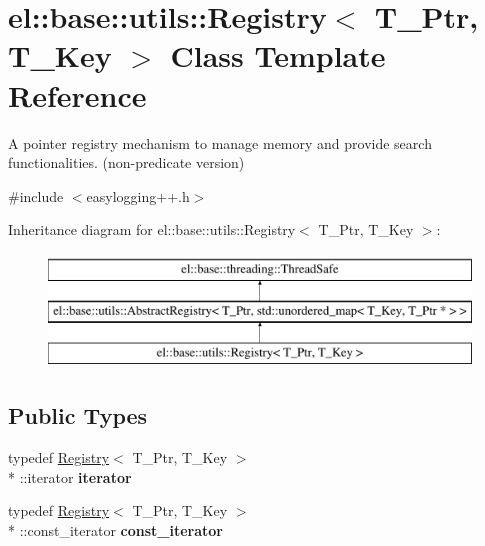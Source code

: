 \hypertarget{classel_1_1base_1_1utils_1_1Registry}{\section{el\-:\-:base\-:\-:utils\-:\-:Registry$<$ T\-\_\-\-Ptr, T\-\_\-\-Key $>$ Class Template Reference}
\label{classel_1_1base_1_1utils_1_1Registry}
}


A pointer registry mechanism to manage memory and provide search functionalities. (non-\/predicate version)  




{\ttfamily \#include $<$easylogging++.\-h$>$}

Inheritance diagram for el\-:\-:base\-:\-:utils\-:\-:Registry$<$ T\-\_\-\-Ptr, T\-\_\-\-Key $>$\-:\begin{figure}[H]
\begin{center}
\leavevmode
\includegraphics[height=3.000000cm]{classel_1_1base_1_1utils_1_1Registry}
\end{center}
\end{figure}
\subsection*{Public Types}
\begin{DoxyCompactItemize}
\item 
\hypertarget{classel_1_1base_1_1utils_1_1Registry_a31f3d725285e6b65f1f9e990066f96ed}{typedef \hyperlink{classel_1_1base_1_1utils_1_1Registry}{Registry}$<$ T\-\_\-\-Ptr, T\-\_\-\-Key $>$\\*
\-::iterator {\bfseries iterator}}\label{classel_1_1base_1_1utils_1_1Registry_a31f3d725285e6b65f1f9e990066f96ed}

\item 
\hypertarget{classel_1_1base_1_1utils_1_1Registry_a955e62adc74c60d0205b52a3fc430cef}{typedef \hyperlink{classel_1_1base_1_1utils_1_1Registry}{Registry}$<$ T\-\_\-\-Ptr, T\-\_\-\-Key $>$\\*
\-::const\-\_\-iterator {\bfseries const\-\_\-iterator}}\label{classel_1_1base_1_1utils_1_1Registry_a955e62adc74c60d0205b52a3fc430cef}

\end{DoxyCompactItemize}
